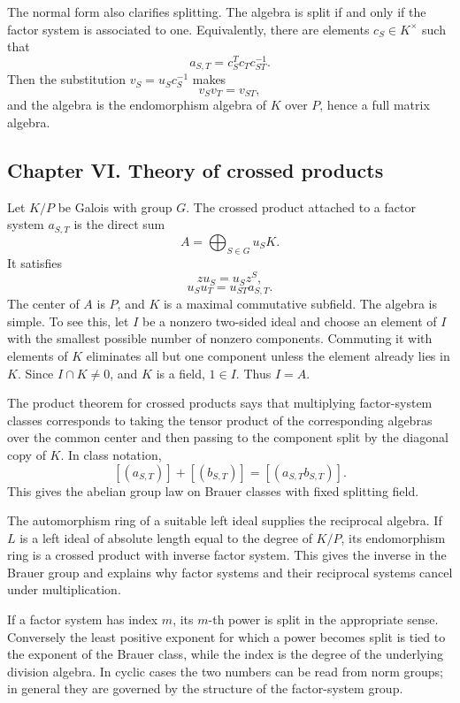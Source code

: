 \documentclass[12pt]{article}
\begin{document}
The normal form also clarifies splitting. The algebra is split if and only if the factor system is associated to one. Equivalently, there are elements \(c_S\in K^{\times}\) such that
\[
  a_{S,T}=c_S^Tc_Tc_{ST}^{-1}.
\]
Then the substitution \(v_S=u_Sc_S^{-1}\) makes
\[
  v_Sv_T=v_{ST},
\]
and the algebra is the endomorphism algebra of \(K\) over \(P\), hence a full matrix algebra.

\subsection{Chapter VI. Theory of crossed products}

Let \(K/P\) be Galois with group \(G\). The crossed product attached to a factor system \(a_{S,T}\) is the direct sum
\[
  A=\bigoplus_{S\in G}u_SK.
\]
It satisfies
\[
  z u_S=u_S z^S,
\]
\[
  u_Su_T=u_{ST}a_{S,T}.
\]
The center of \(A\) is \(P\), and \(K\) is a maximal commutative subfield. The algebra is simple. To see this, let \(I\) be a nonzero two-sided ideal and choose an element of \(I\) with the smallest possible number of nonzero components. Commuting it with elements of \(K\) eliminates all but one component unless the element already lies in \(K\). Since \(I\cap K\ne0\), and \(K\) is a field, \(1\in I\). Thus \(I=A\).

The product theorem for crossed products says that multiplying factor-system classes corresponds to taking the tensor product of the corresponding algebras over the common center and then passing to the component split by the diagonal copy of \(K\). In class notation,
\[
  [(a_{S,T})]+[(b_{S,T})]=[(a_{S,T}b_{S,T})].
\]
This gives the abelian group law on Brauer classes with fixed splitting field.

The automorphism ring of a suitable left ideal supplies the reciprocal algebra. If \(L\) is a left ideal of absolute length equal to the degree of \(K/P\), its endomorphism ring is a crossed product with inverse factor system. This gives the inverse in the Brauer group and explains why factor systems and their reciprocal systems cancel under multiplication.

If a factor system has index \(m\), its \(m\)-th power is split in the appropriate sense. Conversely the least positive exponent for which a power becomes split is tied to the exponent of the Brauer class, while the index is the degree of the underlying division algebra. In cyclic cases the two numbers can be read from norm groups; in general they are governed by the structure of the factor-system group.
\end{document}
